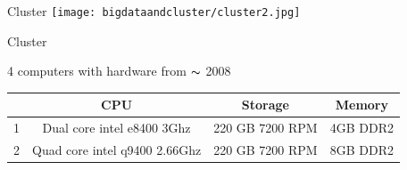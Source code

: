 \begin{frame}{Cluster}
  \centering \texttt{[image: bigdataandcluster/cluster2.jpg]}
\end{frame}
\begin{frame}{Cluster}

    4 computers with hardware from $\thicksim$ 2008
      \begin{tabular}{|r|ccc|}
    \hline
      & CPU & Storage & Memory \\\hline
    1 & Dual core intel e8400 3Ghz & 220 GB 7200 RPM & 4GB DDR2 \\
    2 & Quad core intel q9400 2.66Ghz & 220 GB 7200 RPM & 8GB DDR2 \\\hline
  \end{tabular}
\end{frame}






